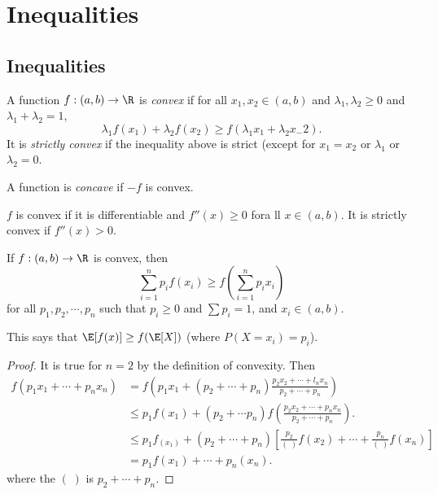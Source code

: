 \documentclass[a4paper]{article}
\begin{document}
\section{Inequalities}
\subsection{Inequalities}
\begin{defi}
  A function $f: (a, b) \to \R$ is \emph{convex} if for all $x_1, x_2\in (a, b)$ and $\lambda_1, \lambda_2 \geq 0$ and $\lambda_1 + \lambda_2 = 1$,\[
    \lambda_1f(x_1) + \lambda_2 f(x_2) \geq f(\lambda_1x_1 + \lambda_2 x_-2).
  \]
  It is \emph{strictly convex} if the inequality above is strict (except for $x_1 = x_2$ or $\lambda_1$ or $\lambda_2 = 0$.

  \begin{center}
  \end{center}
  A function is \emph{concave} if $-f$ is convex.
\end{defi}

\begin{prop}
  $f$ is convex if it is differentiable and $f''(x) \geq 0$ fora ll $x\in (a, b)$. It is strictly convex if $f''(x) > 0$.
\end{prop}

\begin{thm}
  If $f:(a, b) \to \R$ is convex, then
  \[
    \sum_{i = 1}^n p_i f(x_i) \geq f\left(\sum_{i = 1}^n p_ix_i\right)
  \]
  for all $p_1, p_2, \cdots, p_n$ such that $p_i \geq 0$ and $\sum p_i = 1$, and $x_i \in (a, b)$.

  This says that $\E[f(x)] \geq f(\E[X])$ (where $P(X=x_i) = p_i$).
\end{thm}

\begin{proof}
  It is true for $n = 2$ by the definition of convexity. Then
  \begin{align*}
    f(p_1x_1 + \cdots + p_nx_n) &= f\left(p_1x_1 + (p_2 + \cdots + p_n)\frac{p_2x_2 + \cdots + l_nx_n}{p_2 + \cdots + p_n}\right)\\
    &\leq p_1f(x_1) + (p_2 + \cdots p_n)f\left(\frac{p_2x_2 + \cdots + p_n x_n}{p_2 + \cdots + p_n }\right).\\
    &\leq p_1f_(x_1) + (p_2 + \cdots + p_n)\left[\frac{p_2}{(\;)}f(x_2) + \cdots + \frac{p_n}{(\;)}f(x_n)\right]\\
    &= p_1f(x_1) + \cdots + p_n(x_n).
  \end{align*}
  where the $(\;)$ is $p_2 + \cdots + p_n$.
\end{proof}
\end{document}
